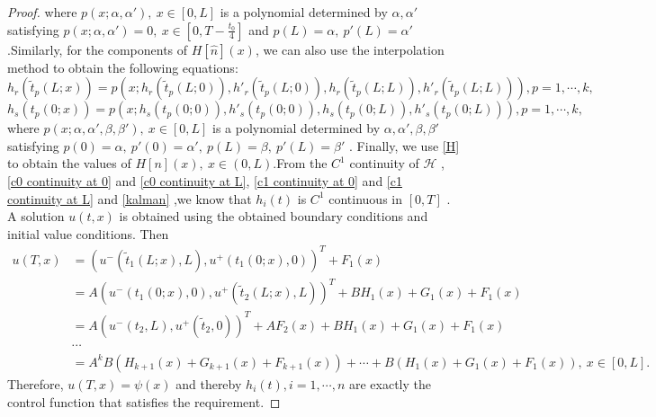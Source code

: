 \documentclass[a4paper,reqno,11pt]{amsart}
\numberwithin{equation}{section} %
\begin{document}
\begin{proof}
where $p(x;\alpha ,\alpha  ') ,\ x \in [0,L]$ is a polynomial determined by $\alpha ,\alpha  '$ satisfying $p(x;\alpha ,\alpha  ') =0, \  x \in [0,T-\frac{t_0}{4}]$ and $p(L)=\alpha ,\ p'(L)=\alpha  '$ .Similarly, for the components of $H\left[ \hat{n} \right] \left( x \right)$, we can also use the interpolation method to obtain the following equations:
\begin{equation}\label{polynomial p r}
	h_r\left( \tilde{t}_p\left( L;x \right) \right) =p\left( x;h_r\left( \tilde{t}_p\left( L;0 \right) \right) ,h'_r\left( \tilde{t}_p\left( L;0 \right) \right) ,h_r\left( \tilde{t}_p\left( L;L \right) \right) ,h'_r\left( \tilde{t}_p\left( L;L \right) \right) \right) ,p=1,\cdots,k,
\end{equation}
\begin{equation}\label{polynomial p s}
	h_s\left( t_p\left( 0;x \right) \right) =p\left( x;h_s\left( t_p\left( 0;0 \right) \right) ,h'_s\left( t_p\left( 0;0 \right) \right) ,h_s\left( t_p\left( 0;L \right) \right) ,h'_s\left( t_p\left( 0;L \right) \right) \right) ,p=1,\cdots,k,
\end{equation}
where $p(x;\alpha ,\alpha  ',\beta ,\beta  ') ,\ x \in [0,L]$ is a polynomial determined by $\alpha ,\alpha  ',\beta ,\beta  '$ satisfying $p(0)=\alpha ,\ p'(0)=\alpha  ',\ p(L)=\beta ,\ p'(L)=\beta  '$ . Finally, we use \eqref{H} to obtain the values of $H\left[ n \right] \left( x \right),\  x \in (0,L)$.From the $C^1$ continuity of $\mathcal{H}$ , \eqref{c0 continuity at 0} and \eqref{c0 continuity at L}, \eqref{c1 continuity at 0} and \eqref{c1 continuity at L} and \eqref{kalman} ,we know that $h_i(t)$ is $C^1$ continuous in $[0,T]$ .
A solution $u(t,x)$ is obtained using the obtained boundary conditions and initial value conditions. Then
\begin{equation}
	\begin{aligned}
		u(T,x)				   &=(u^- (\tilde{t} _1(L;x) ,L) ,u^+ (t _1(0;x),0))^T + F_1(x)\\
							   &=A(u^- (t _1(0;x) ,0) ,u^+ (\tilde{t} _2 (L;x),L))^T + BH_1(x)+G_1(x)+F_1(x)\\
							   &=A(u^- (t _2 ,L) ,u^+ (\tilde{t} _2 ,0))^T +AF_2(x)+ BH_1(x)+G_1(x)+F_1(x)\\
							   & \cdots \\
							   &=A^kB(H_{k+1}\left( x \right)+G_{k+1}\left( x \right)+F_{k+1}\left( x \right)) +\cdots  +B(H_1\left( x \right)+G_1\left( x \right)+F_1\left( x \right)) ,\ x\in \left[ 0,L \right].
	\end{aligned}
\end{equation}
Therefore, $u(T,x)=\psi(x)$ and thereby $h_i(t),i=1,\cdots,n$ are exactly the control function that satisfies the requirement.
\end{proof}
\end{document}

